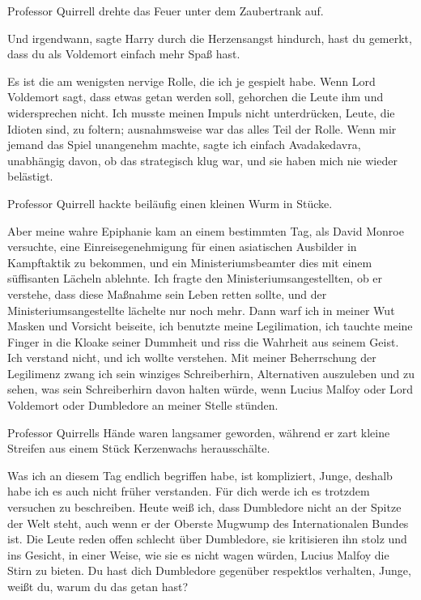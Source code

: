 Professor Quirrell drehte das Feuer unter dem Zaubertrank auf.

\glqq{}Und irgendwann\grqq{}, sagte Harry durch die Herzensangst hindurch, \glqq{}
hast du gemerkt, dass du als Voldemort einfach mehr Spaß hast.\grqq{}

\glqq{}Es ist die am wenigsten nervige Rolle, die ich je gespielt habe. Wenn Lord
Voldemort sagt, dass etwas getan werden soll, gehorchen die Leute ihm und
widersprechen nicht. Ich musste meinen Impuls nicht unterdrücken, Leute, die
Idioten sind, zu foltern; ausnahmsweise war das alles Teil der Rolle. Wenn mir
jemand das Spiel unangenehm machte, sagte ich einfach Avadakedavra, unabhängig
davon, ob das strategisch klug war, und sie haben mich nie wieder belästigt.\grqq{}

Professor Quirrell hackte beiläufig einen kleinen Wurm in Stücke.

\glqq{}Aber meine wahre Epiphanie kam an einem bestimmten Tag, als David Monroe
versuchte, eine Einreisegenehmigung für einen asiatischen Ausbilder in
Kampftaktik zu bekommen, und ein Ministeriumsbeamter dies mit einem süffisanten
Lächeln ablehnte. Ich fragte den Ministeriumsangestellten, ob er verstehe, dass
diese Maßnahme sein Leben retten sollte, und der Ministeriumsangestellte
lächelte nur noch mehr. Dann warf ich in meiner Wut Masken und Vorsicht
beiseite, ich benutzte meine Legilimation, ich tauchte meine Finger in die
Kloake seiner Dummheit und riss die Wahrheit aus seinem Geist. Ich verstand
nicht, und ich wollte verstehen. Mit meiner Beherrschung der Legilimenz zwang
ich sein winziges Schreiberhirn, Alternativen auszuleben und zu sehen, was sein
Schreiberhirn davon halten würde, wenn Lucius Malfoy oder Lord Voldemort oder
Dumbledore an meiner Stelle stünden.\grqq{}

Professor Quirrells Hände waren langsamer geworden, während er zart kleine
Streifen aus einem Stück Kerzenwachs herausschälte.

\glqq{}Was ich an diesem Tag endlich begriffen habe, ist kompliziert, Junge,
deshalb habe ich es auch nicht früher verstanden. Für dich werde ich es trotzdem
versuchen zu beschreiben. Heute weiß ich, dass Dumbledore nicht an der Spitze
der Welt steht, auch wenn er der Oberste Mugwump des Internationalen Bundes ist.
Die Leute reden offen schlecht über Dumbledore, sie kritisieren ihn stolz und
ins Gesicht, in einer Weise, wie sie es nicht wagen würden, Lucius Malfoy die
Stirn zu bieten. Du hast dich Dumbledore gegenüber respektlos verhalten, Junge,
weißt du, warum du das getan hast?\grqq{}

